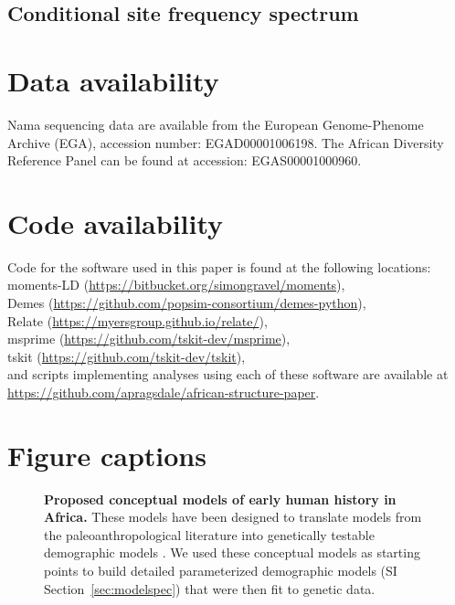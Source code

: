 \documentclass[]{article}
\begin{document}
\subsection*{Conditional site frequency spectrum}

\section*{Data availability}

Nama sequencing data are available from the European Genome-Phenome Archive (EGA),
accession number: EGAD00001006198. The African Diversity Reference Panel can be
found at accession: EGAS00001000960.

\section*{Code availability}

Code for the software used in this paper is found at the following locations:\\
moments-LD (\url{https://bitbucket.org/simongravel/moments}),\\
Demes (\url{https://github.com/popsim-consortium/demes-python}),\\
Relate (\url{https://myersgroup.github.io/relate/}),\\
msprime (\url{https://github.com/tskit-dev/msprime}),\\
tskit (\url{https://github.com/tskit-dev/tskit}),\\
and scripts implementing analyses using each of these software are available at\\
\url{https://github.com/apragsdale/african-structure-paper}.

\break

\section*{Figure captions}

\begin{figure}[ht]
    \centering
    \caption{
        \textbf{Proposed conceptual models of early human history in Africa.}
        These models have been designed to translate models from the 
        paleoanthropological literature into genetically testable demographic
        models \citep{Henn2018-rf}.
        We used these conceptual models as starting points to build detailed
        parameterized demographic models (SI Section~\ref{sec:modelspec})
        that were then fit to genetic data. 
    }
    \label{fig:proposed-models}
\end{figure}
\end{document}
